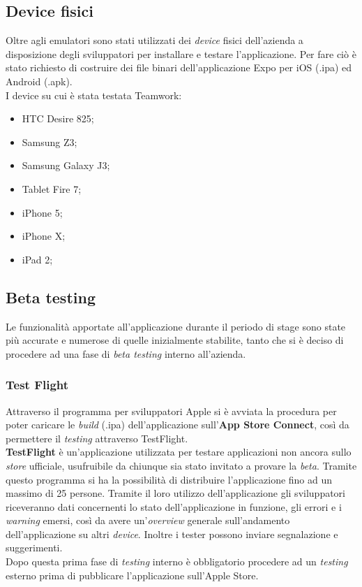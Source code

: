 \subsection{Device fisici}
Oltre agli emulatori sono stati utilizzati dei \emph{device} fisici dell'azienda a disposizione degli sviluppatori per installare e testare l'applicazione. Per fare ciò è stato richiesto di costruire dei file binari dell'applicazione Expo per iOS (.ipa) ed Android (.apk). \\
I device su cui è stata testata Teamwork:
\begin{itemize}
	\item HTC Desire 825;
	\item Samsung Z3;
	\item Samsung Galaxy J3;
	\item Tablet Fire 7;
	\item iPhone 5;
	\item iPhone X;
	\item iPad 2;
\end{itemize}

\subsection{Beta testing}
Le funzionalità apportate all'applicazione durante il periodo di stage sono state più accurate e numerose di quelle inizialmente stabilite, tanto che si è deciso di procedere ad una fase di \emph{beta testing} interno all'azienda.\\
\subsubsection{Test Flight}
Attraverso il programma per sviluppatori Apple si è avviata la procedura per poter caricare le \emph{build} (.ipa) dell'applicazione sull'\textbf{App Store Connect}, così da permettere il \emph{testing} attraverso TestFlight.\\
\textbf{TestFlight} è un'applicazione utilizzata per testare applicazioni non ancora sullo \emph{store} ufficiale, usufruibile da chiunque sia stato invitato a provare la \emph{beta}. Tramite questo programma si ha la possibilità di distribuire l'applicazione fino ad un massimo di 25 persone.
Tramite il loro utilizzo dell'applicazione gli sviluppatori riceveranno dati concernenti lo stato dell'applicazione in funzione, gli errori e i \emph{warning} emersi, così da avere un'\emph{overview} generale sull'andamento dell'applicazione su altri \emph{device}. Inoltre i tester possono inviare segnalazione e suggerimenti. \\
Dopo questa prima fase di \emph{testing} interno è obbligatorio procedere ad un \emph{testing} esterno prima di pubblicare l'applicazione sull'Apple Store.